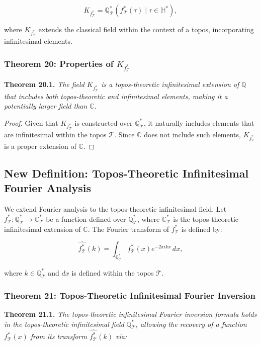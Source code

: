 \documentclass{article}
\begin{document}
\[
K_{f_{\mathcal{T}}^*} = \mathbb{Q}_{\mathcal{T}}^*(f_{\mathcal{T}}^*(\tau) \mid \tau \in \mathbb{H}^*),
\]

where \(K_{f_{\mathcal{T}}^*}\) extends the classical field within the context of a topos, incorporating infinitesimal elements.

\subsubsection{Theorem 20: Properties of \(K_{f_{\mathcal{T}}^*}\)}
\textbf{Theorem 20.1.} \textit{The field \(K_{f_{\mathcal{T}}^*}\) is a topos-theoretic infinitesimal extension of \(\mathbb{Q}\) that includes both topos-theoretic and infinitesimal elements, making it a potentially larger field than \(\mathbb{C}\).}

\begin{proof}
Given that \(K_{f_{\mathcal{T}}^*}\) is constructed over \(\mathbb{Q}_{\mathcal{T}}^*\), it naturally includes elements that are infinitesimal within the topos \(\mathcal{T}\). Since \(\mathbb{C}\) does not include such elements, \(K_{f_{\mathcal{T}}^*}\) is a proper extension of \(\mathbb{C}\).
\end{proof}

\subsection{New Definition: Topos-Theoretic Infinitesimal Fourier Analysis}
We extend Fourier analysis to the topos-theoretic infinitesimal field. Let \(f_{\mathcal{T}}^*: \mathbb{Q}_{\mathcal{T}}^* \to \mathbb{C}_{\mathcal{T}}^*\) be a function defined over \(\mathbb{Q}_{\mathcal{T}}^*\), where \(\mathbb{C}_{\mathcal{T}}^*\) is the topos-theoretic infinitesimal extension of \(\mathbb{C}\). The Fourier transform of \(f_{\mathcal{T}}^*\) is defined by:

\[
\widehat{f_{\mathcal{T}}^*}(k) = \int_{\mathbb{Q}_{\mathcal{T}}^*} f_{\mathcal{T}}^*(x) e^{-2\pi i k x} \, dx,
\]

where \(k \in \mathbb{Q}_{\mathcal{T}}^*\) and \(dx\) is defined within the topos \(\mathcal{T}\).

\subsubsection{Theorem 21: Topos-Theoretic Infinitesimal Fourier Inversion}
\textbf{Theorem 21.1.} \textit{The topos-theoretic infinitesimal Fourier inversion formula holds in the topos-theoretic infinitesimal field \(\mathbb{Q}_{\mathcal{T}}^*\), allowing the recovery of a function \(f_{\mathcal{T}}^*(x)\) from its transform \(\widehat{f_{\mathcal{T}}^*}(k)\) via:}
\end{document}
